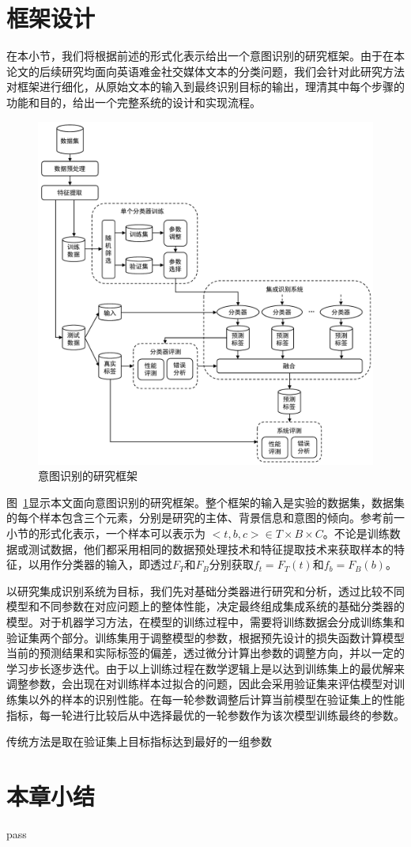 \section{框架设计}

在本小节，我们将根据前述的形式化表示给出一个意图识别的研究框架。由于在本论文的后续研究均面向英语难金社交媒体文本的分类问题，我们会针对此研究方法对框架进行细化，从原始文本的输入到最终识别目标的输出，理清其中每个步骤的功能和目的，给出一个完整系统的设计和实现流程。

\begin{figure}[H]
  \centering
  \includegraphics[width=\textwidth]{img/framework.pdf}
  \caption{意图识别的研究框架}
  \label{fig:framework}
\end{figure}

图~\ref{fig:framework}显示本文面向意图识别的研究框架。整个框架的输入是实验的数据集，数据集的每个样本包含三个元素，分别是研究的主体、背景信息和意图的倾向。参考前一小节的形式化表示，一个样本可以表示为 $<t, b, c> \in T \times B \times C$。不论是训练数据或测试数据，他们都采用相同的数据预处理技术和特征提取技术来获取样本的特征，以用作分类器的输入，即透过$F_T$和$F_B$分别获取$f_t=F_T(t)$和$f_b=F_B(b)$。

以研究集成识别系统为目标，我们先对基础分类器进行研究和分析，透过比较不同模型和不同参数在对应问题上的整体性能，决定最终组成集成系统的基础分类器的模型。对于机器学习方法，在模型的训练过程中，需要将训练数据会分成训练集和验证集两个部分。训练集用于调整模型的参数，根据预先设计的损失函数计算模型当前的预测结果和实际标签的偏差，透过微分计算出参数的调整方向，并以一定的学习步长逐步迭代。由于以上训练过程在数学逻辑上是以达到训练集上的最优解来调整参数，会出现在对训练样本过拟合的问题，因此会采用验证集来评估模型对训练集以外的样本的识别性能。在每一轮参数调整后计算当前模型在验证集上的性能指标，每一轮进行比较后从中选择最优的一轮参数作为该次模型训练最终的参数。

传统方法是取在验证集上目标指标达到最好的一组参数


\section{本章小结}

pass

